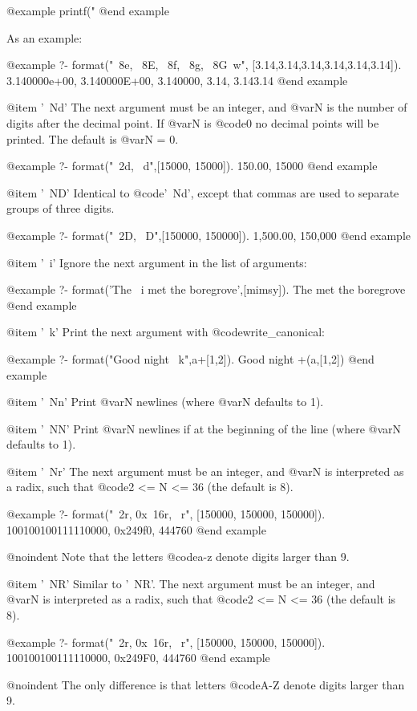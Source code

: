 {{{{{{@example
    printf("%
    @end example

As an example:

@example
?- format("~8e, ~8E, ~8f, ~8g, ~8G~w",
          [3.14,3.14,3.14,3.14,3.14,3.14]).
3.140000e+00, 3.140000E+00, 3.140000, 3.14, 3.143.14
@end example

@item '~Nd'
The next argument must be an integer, and @var{N} is the number of digits
after the decimal point. If @var{N} is @code{0} no decimal points will be
printed. The default is @var{N = 0}.

@example
?- format("~2d, ~d",[15000, 15000]).
150.00, 15000
@end example

@item '~ND'
Identical to @code{'~Nd'}, except that commas are used to separate groups
of three digits.

@example
?- format("~2D, ~D",[150000, 150000]).
1,500.00, 150,000
@end example

@item '~i'
Ignore the next argument in the list of arguments:

@example
?- format('The ~i met the boregrove',[mimsy]).
The  met the boregrove
@end example

@item '~k'
Print the next argument with @code{write_canonical}:

@example
?- format("Good night ~k",a+[1,2]).
Good night +(a,[1,2])
@end example

@item '~Nn'
Print @var{N} newlines (where @var{N} defaults to 1).

@item '~NN'
Print @var{N} newlines if at the beginning of the line (where @var{N}
defaults to 1).

@item '~Nr'
The next argument must be an integer, and @var{N} is interpreted as a
radix, such that @code{2 <= N <= 36} (the default is 8).

@example
?- format("~2r, 0x~16r, ~r",
          [150000, 150000, 150000]).
100100100111110000, 0x249f0, 444760
@end example

@noindent
Note that the letters @code{a-z} denote digits larger than 9.

@item '~NR'
Similar to '~NR'. The next argument must be an integer, and @var{N} is
interpreted as a radix, such that @code{2 <= N <= 36} (the default is 8).

@example
?- format("~2r, 0x~16r, ~r",
          [150000, 150000, 150000]).
100100100111110000, 0x249F0, 444760
@end example

@noindent
The only difference is that letters @code{A-Z} denote digits larger than 9.

}}}}}}
